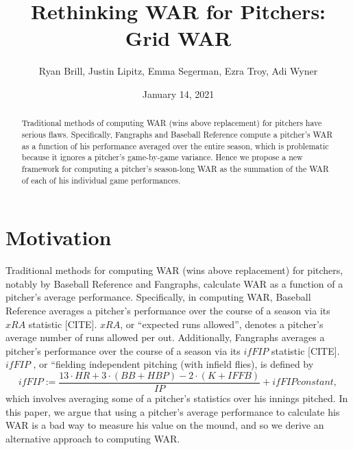 \documentclass[12pt]{article}
\title{Rethinking WAR for Pitchers: Grid WAR}
\author{Ryan Brill, Justin Lipitz, Emma Segerman, Ezra Troy, Adi Wyner}
\date{January 14, 2021}
\begin{document}
\maketitle

\begin{abstract}
Traditional methods of computing WAR (wins above replacement) for pitchers have serious flaws. Specifically, Fangraphs and Baseball Reference compute a pitcher's WAR as a function of his performance averaged over the entire season, which is problematic because it ignores a pitcher's game-by-game variance. Hence we propose a new framework for computing a pitcher's season-long WAR as the summation of the WAR of each of his individual game performances. 
\end{abstract}

\section{Motivation}






Traditional methods for computing WAR (wins above replacement) for pitchers, notably by Baseball Reference and Fangraphs, calculate WAR as a function of a pitcher's average performance. Specifically, in computing WAR, Baseball Reference averages a pitcher's performance over the course of a season via its $xRA$ statistic [CITE]. $xRA$, or ``expected runs allowed'', denotes a pitcher's average number of runs allowed per out. Additionally, Fangraphs averages a pitcher's performance over the course of a season via its $ifFIP$ statistic [CITE]. $ifFIP$ , or ``fielding independent pitching (with infield flies), is defined by
$$ifFIP := \frac{13\cdot HR + 3\cdot(BB+HBP) - 2\cdot(K+IFFB)}{IP} + ifFIP constant,$$
which involves averaging some of a pitcher's statistics over his innings pitched. In this paper, we argue that using a pitcher's average performance to calculate his WAR is a bad way to measure his value on the mound, and so we derive an alternative approach to computing WAR.  
\end{document}
